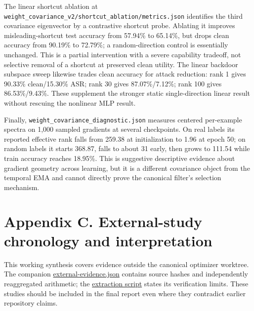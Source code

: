 \documentclass[
  british,
  10pt,
  a4paper,
]{article}
\begin{document}
The linear shortcut ablation at
\texttt{weight\_\allowbreak{}covariance\_\allowbreak{}v2/\allowbreak{}shortcut\_\allowbreak{}ablation/\allowbreak{}metrics.\allowbreak{}json}
identifies the third covariance eigenvector by a contrastive shortcut
probe. Ablating it improves misleading-\allowbreak{}shortcut test
accuracy from 57.94\% to 65.14\%, but drops clean accuracy from 90.19\%
to 72.79\%; a random-\allowbreak{}direction control is essentially
unchanged. This is a partial intervention with a severe capability
tradeoff, not selective removal of a shortcut at preserved clean
utility. The linear backdoor subspace sweep likewise trades clean
accuracy for attack reduction: rank 1 gives 90.33\%
clean/\allowbreak{}15.\allowbreak{}30\% ASR; rank 30 gives
87.\allowbreak{}07\%/\allowbreak{}7.\allowbreak{}12\%; rank 100 gives
86.\allowbreak{}53\%/\allowbreak{}9.\allowbreak{}43\%.\allowbreak{}
These supplement the stronger static single-\allowbreak{}direction
linear result without rescuing the nonlinear MLP result.

Finally,
\texttt{weight\_\allowbreak{}covariance\_\allowbreak{}diagnostic.\allowbreak{}json}
measures centered per-\allowbreak{}example spectra on 1,000 sampled
gradients at several checkpoints.\allowbreak{} On real labels its
reported effective rank falls from 259.38 at initialization to 1.96 at
epoch 50; on random labels it starts 368.87, falls to about 31 early,
then grows to 111.54 while train accuracy reaches 18.95\%. This is
suggestive descriptive evidence about gradient geometry across learning,
but it is a different covariance object from the temporal EMA and cannot
directly prove the canonical filter's selection mechanism.

\clearpage

\section{\texorpdfstring{Appendix C. External-\allowbreak{}study
chronology and
interpretation}{Appendix C.  chronology and interpretation}}\label{external-studies}

This working synthesis covers evidence outside the canonical optimizer
worktree. The companion
\href{../analysis/external-evidence.json}{external-\allowbreak{}evidence.\allowbreak{}json}
contains source hashes and independently reaggregated arithmetic; the
\href{../analysis/extract_external_evidence.py}{extraction script}
states its verification limits. These studies should be included in the
final report even where they contradict earlier repository claims.
\end{document}
